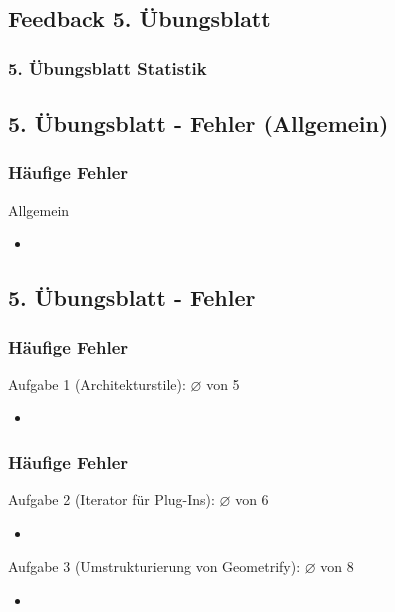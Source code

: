 \documentclass[18pt]{beamer}
\begin{document}
	\subsection{Feedback 5. Übungsblatt}
	\begin{frame}
		\frametitle{5. Übungsblatt Statistik}
	\end{frame}

	\subsection{5. Übungsblatt - Fehler (Allgemein)}
	\begin{frame}
		\frametitle{Häufige Fehler}
		\begin{block}{Allgemein}
			\begin{itemize}
				\item %
			\end{itemize}
		\end{block}
	\end{frame}

	\subsection{5. Übungsblatt - Fehler}
	\begin{frame}
		\frametitle{Häufige Fehler}
		\begin{block}{Aufgabe 1 (Architekturstile): $\diameter$   von 5} %
			\begin{itemize}
				\pause 
				\item %
			\end{itemize}
		\end{block}
	\end{frame}

	\begin{frame}
		\frametitle{Häufige Fehler}
		\begin{block}{Aufgabe 2 (Iterator für Plug-Ins): $\diameter$ von 6} %
			\begin{itemize}
				\pause 
				\item %
			\end{itemize}
		\end{block}
		\pause 
		\begin{block}{Aufgabe 3 (Umstrukturierung von Geometrify): $\diameter$ von 8} %
			\begin{itemize}
				\item %
			\end{itemize}
		\end{block}
	\end{frame}
\end{document}
